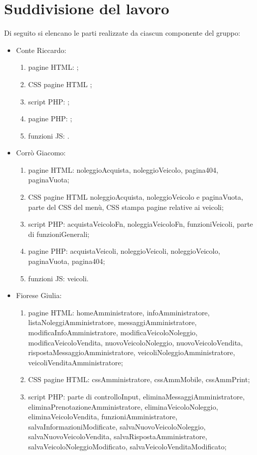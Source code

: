 \section{Suddivisione del lavoro}
Di seguito si elencano le parti realizzate da ciascun componente del gruppo:
\begin{itemize}
    \item Conte Riccardo:
        \begin{enumerate}
        \item pagine HTML: ;
        \item CSS pagine HTML ;
        \item script PHP: ;
        \item pagine PHP: ;
        \item funzioni JS: .
        \end{enumerate}
    \item Corrò Giacomo:
        \begin{enumerate}
            \item pagine HTML: noleggioAcquista, noleggioVeicolo, pagina404, paginaVuota;
            \item CSS pagine HTML noleggioAcquista, noleggioVeicolo e paginaVuota, parte del CSS del menù, CSS stampa pagine relative ai veicoli;
            \item script PHP: acquistaVeicoloFn, noleggiaVeicoloFn, funzioniVeicoli, parte di funzioniGenerali;
            \item pagine PHP: acquistaVeicoli, noleggioVeicoli, noleggioVeicolo, paginaVuota, pagina404;
            \item funzioni JS: veicoli.
        \end{enumerate}
    \item Fiorese Giulia:
        \begin{enumerate}
            \item pagine HTML: homeAmministratore, infoAmministratore, listaNoleggiAmministratore, messaggiAmministratore, modificaInfoAmministratore, modificaVeicoloNoleggio, modificaVeicoloVendita, nuovoVeicoloNoleggio, nuovoVeicoloVendita, rispostaMessaggioAmministratore, veicoliNoleggioAmministratore, veicoliVenditaAmministratore;
            \item CSS pagine HTML: cssAmministratore, cssAmmMobile, cssAmmPrint;
            \item script PHP: parte di controlloInput, eliminaMessaggiAmministratore, eliminaPrenotazioneAmministratore, eliminaVeicoloNoleggio, eliminaVeicoloVendita, funzioniAmministratore, salvaInformazioniModificate, salvaNuovoVeicoloNoleggio, salvaNuovoVeicoloVendita, salvaRispostaAmministratore, salvaVeicoloNoleggioModificato, salvaVeicoloVenditaModificato;

\end{enumerate}
\end{itemize}
